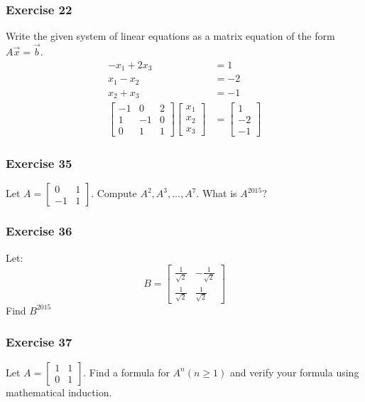 \documentclass[letterpaper, 12pt]{math}
\begin{document}
\subsubsection*{Exercise 22}
Write the given system of linear equations as a matrix equation of the form
\( A\vec{x} = \vec{b} \).
\begin{align*}
  -x_1 + 2x_3 &= 1 \\
  x_1-x_2 &= -2 \\
  x_2+x_3 &= -1 \\
  \begin{bmatrix}
    -1 & 0 & 2 \\
    1 & -1 & 0 \\
    0 & 1 & 1
  \end{bmatrix}\begin{bmatrix}
    x_1 \\ x_2 \\ x_3
  \end{bmatrix} &= \begin{bmatrix}
    1 \\ -2 \\ -1
  \end{bmatrix}
\end{align*}

\subsubsection*{Exercise 35}
Let \( A = \begin{bmatrix}0 & 1 \\ -1 & 1\end{bmatrix} \). Compute \( A^2,A^3,
\dots,A^7 \). What is \( A^{2015} \)?

\subsubsection*{Exercise 36}
Let:
\[ B = \begin{bmatrix}
  \frac{1}{\sqrt{2}} & -\frac{1}{\sqrt{2}} \\
  \frac{1}{\sqrt{2}} & \frac{1}{\sqrt{2}}
\end{bmatrix} \]
Find \( B^{2015} \)

\subsubsection*{Exercise 37}
Let \( A = \begin{bmatrix}1 & 1 \\ 0 & 1\end{bmatrix} \). Find a formula for
\( A^n(n\ge1) \) and verify your formula using mathematical induction.
\end{document}
